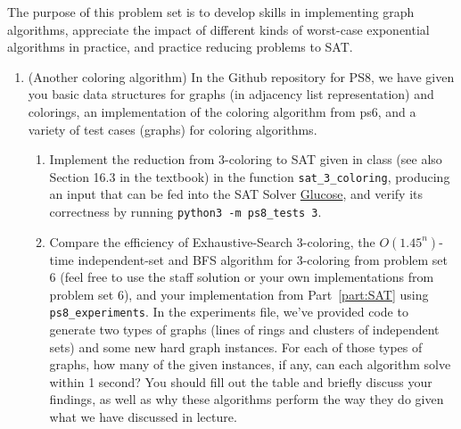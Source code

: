 \documentclass[11pt]{article}
\begin{document}
The purpose of this problem set is to develop skills in implementing graph algorithms, appreciate the impact of different kinds of worst-case exponential algorithms in practice, and practice reducing problems to SAT.
\begin{enumerate}


\item (Another coloring algorithm)
  In the Github repository for PS8, we have given you basic data structures for graphs (in adjacency list representation) and colorings, an implementation of the coloring algorithm from ps6, and a variety of test cases (graphs) for coloring algorithms.


  \begin{enumerate}

      \item Implement the reduction from 3-coloring to SAT given in class (see also Section 16.3 in the textbook) in the function \texttt{sat\_3\_coloring}, producing an input that can be fed into the SAT Solver \href{https://pysathq.github.io/usage/}{Glucose}, and verify its correctness by running \texttt{python3 -m ps8\_tests 3}. \label{part:SAT}

      \item Compare the efficiency of Exhaustive-Search 3-coloring, the $O(1.45^n)$-time independent-set and BFS algorithm for 3-coloring from problem set 6 (feel free to use the staff solution or your own implementations from problem set 6), and your implementation from  Part~\ref{part:SAT} using \texttt{ps8\_experiments}. In the experiments file, we've provided code to generate two types of graphs (lines of rings and clusters of independent sets) and some new hard graph instances. For each of those types of graphs, how many of the given instances, if any, can each algorithm solve within 1 second? You should fill out the table and briefly discuss your findings, as well as why these algorithms perform the way they do given what we have discussed in lecture.


\end{enumerate}
\end{enumerate}
\end{document}
